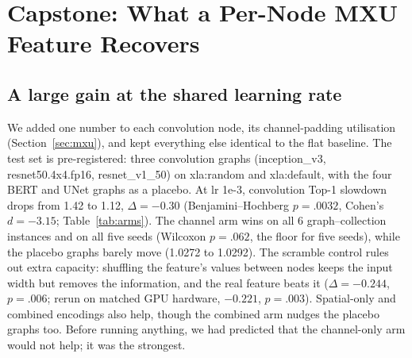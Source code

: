 \section{Capstone: What a Per-Node MXU Feature Recovers}
\label{sec:capstone}

\subsection{A large gain at the shared learning rate}
\label{sec:capstone-shared}
We added one number to each convolution node, its channel-padding utilisation
(Section~\ref{sec:mxu}), and kept everything else identical to the flat baseline. The test set is
pre-registered: three convolution graphs (inception\_v3, resnet50.4x4.fp16, resnet\_v1\_50) on
xla:random and xla:default, with the four BERT and UNet graphs as a placebo. At lr 1e-3, convolution
Top-1 slowdown drops from 1.42 to 1.12, $\Delta = -0.30$ (Benjamini--Hochberg $p = .0032$, Cohen's
$d = -3.15$; Table~\ref{tab:arms}). The channel arm wins on all 6 graph--collection instances and on
all five seeds (Wilcoxon $p = .062$, the floor for five seeds), while the placebo graphs barely move
(1.0272 to 1.0292). The scramble control rules out extra capacity: shuffling the feature's values
between nodes keeps the input width but removes the information, and the real feature beats it
($\Delta = -0.244$, $p = .006$; rerun on matched GPU hardware, $-0.221$, $p = .003$). Spatial-only and
combined encodings also help, though the combined arm nudges the placebo graphs too. Before running
anything, we had predicted that the channel-only arm would not help; it was the strongest.

\begin{table}[t]
\caption{Convolution (CONV, 3 graphs) and placebo (OTHER, 4 graphs) Top-1 slowdown for each MXU
encoding against the untuned baseline at the shared lr of 1e-3 (mean $\pm$ std over 5 paired seeds;
evaluation batch 32; verdicts unchanged at batch 8). BH-$p$ is Benjamini--Hochberg-adjusted over the
three arms.}
\label{tab:arms}
\centering
\small

\end{table}

